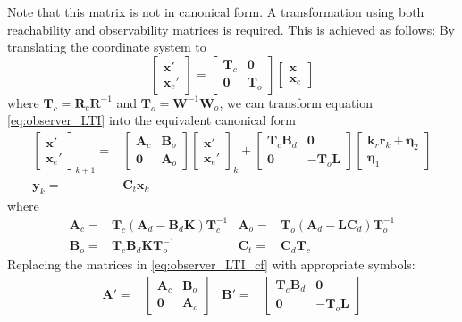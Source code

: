 \documentclass[sigconf]{llncs}
\newcommand{\mat}[1]{\boldsymbol{#1}}
\renewcommand{\vec}[1]{\boldsymbol{#1}}
\begin{document}
Note that this matrix is not in canonical form. A transformation using both reachability and observability matrices is required. This is achieved as follows:
By translating the coordinate system to 
\begin{equation}
\left[\begin{array}{c}\vec{x}'\\ \vec{x}_e'\end{array}\right]=
\left[\begin{array}{cc}\mat{T}_c & \mat{0}\\\mat{0} & \mat{T}_o\end{array}\right]
\left[\begin{array}{c}\vec{x}\\ \vec{x}_e\end{array}\right]
\end{equation}
where $\mat{T}_c=\mat{R}_{c}\mat{R}^{-1}$ and $\mat{T}_o=\mat{W}^{-1}\mat{W}_{o}$, we can transform equation \eqref{eq:observer_LTI} into the equivalent canonical form
\begin{align}
\left [\begin{array}{c}\vec{x}'\\ \vec{x}_e' \end{array}\right]_{k+1}
=& \left [\begin{array}{cc}\mat{A}_{c}&\mat{B}_{o}\\ \mat{0}&\mat{A}_{o}\end{array}\right]
\left [\begin{array}{c}\vec{x}'\\ \vec{x}_e' \end{array}\right]_k
+\left[\begin{array}{cc}\mat{T}_c\mat{B}_d&\mat{0}\\\mat{0}&-\mat{T}_o\mat{L}\end{array}\right]\left [\begin{array}{c}\mat{k}_r\vec{r}_k+\vec{\eta}_2\\ \vec{\eta}_1\end{array}\right]\nonumber\\
\vec{y}_k
=& \mat{C}_{t}\vec{x}_k%
\label{eq:observer_LTI_cf}
\end{align}
where
{
\begin{align*}
\mat{A}_{c}=&\mat{T}_c\left(\mat{A}_d-\mat{B}_d\mat{K}\right)\mat{T}_c^{-1}&
\mat{A}_{o}=&\mat{T}_o\left(\mat{A}_d-\mat{L}\mat{C}_d\right)\mat{T}_o^{-1}\\
\mat{B}_{o}=&\mat{T}_c\mat{B}_d\mat{K}\mat{T}_o^{-1}&
\mat{C}_t=&\mat{C}_d\mat{T}_c
\end{align*}
Replacing the matrices in \eqref{eq:observer_LTI_cf} with appropriate symbols:
\begin{align}
\mat{A}'=&\left [\begin{array}{cc}\mat{A}_{c}&\mat{B}_{o}\\ \mat{0}&\mat{A}_{o}\end{array}\right]&
\mat{B}'=&\left[\begin{array}{cc}\mat{T}_c\mat{B}_d&\mat{0}\\\mat{0}&-\mat{T}_o\mat{L}\end{array}\right]
\label{eq:of_dynamics}
\end{align}
}
\end{document}
